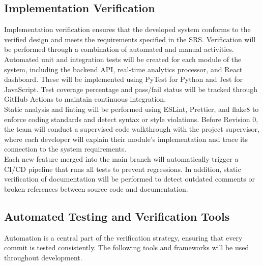 \documentclass[12pt, titlepage]{article}
\begin{document}
\subsection{Implementation Verification}

Implementation verification ensures that the developed system conforms to the verified design and meets the requirements specified in the SRS. Verification will be performed through a combination of automated and manual activities.\\

Automated unit and integration tests will be created for each module of the system, including the backend API, real-time analytics processor, and React dashboard. These will be implemented using PyTest for Python and Jest for JavaScript. Test coverage percentage and pass/fail status will be tracked through GitHub Actions to maintain continuous integration.\\

Static analysis and linting will be performed using ESLint, Prettier, and flake8 to enforce coding standards and detect syntax or style violations. Before Revision 0, the team will conduct a supervised code walkthrough with the project supervisor, where each developer will explain their module’s implementation and trace its connection to the system requirements.\\

Each new feature merged into the main branch will automatically trigger a CI/CD pipeline that runs all tests to prevent regressions. In addition, static verification of documentation will be performed to detect outdated comments or broken references between source code and documentation.\\

\subsection{Automated Testing and Verification Tools}

Automation is a central part of the verification strategy, ensuring that every commit is tested consistently. The following tools and frameworks will be used throughout development.\\
\end{document}
